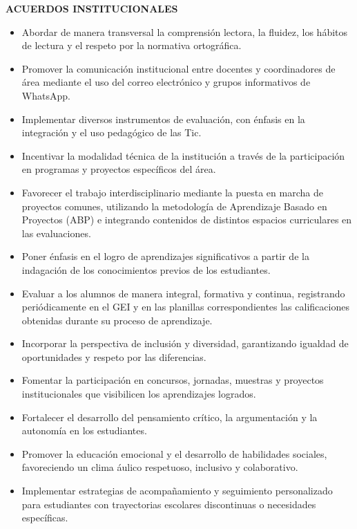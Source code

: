 \documentclass[a4paper,12pt]{article}
\begin{document}
\begin{center}
  \fontsize{12pt}{14pt}\selectfont \textbf{\uppercase{ACUERDOS INSTITUCIONALES}}
\end{center}
\begin{itemize}[leftmargin=*, itemsep=0pt, parsep=0pt]
  \item Abordar de manera transversal la comprensión lectora, la
    fluidez, los hábitos de lectura y el respeto por la normativa ortográfica.
  \item Promover la comunicación institucional entre docentes y
    coordinadores de área mediante el uso del correo electrónico y
    grupos informativos de WhatsApp.
  \item Implementar diversos instrumentos de evaluación, con énfasis
    en la integración y el uso pedagógico de las Tic.
  \item Incentivar la modalidad técnica de la institución a través de
    la participación en programas y proyectos específicos del área.
  \item Favorecer el trabajo interdisciplinario mediante la puesta en
    marcha de proyectos comunes, utilizando la metodología de
    Aprendizaje Basado en Proyectos (ABP) e integrando contenidos de
    distintos espacios curriculares en las evaluaciones.
  \item Poner énfasis en el logro de aprendizajes significativos a
    partir de la indagación de los conocimientos previos de los estudiantes.
  \item Evaluar a los alumnos de manera integral, formativa y
    continua, registrando periódicamente en el GEI y en las planillas
    correspondientes las calificaciones obtenidas durante su proceso
    de aprendizaje.
  \item Incorporar la perspectiva de inclusión y diversidad,
    garantizando igualdad de oportunidades y respeto por las diferencias.
  \item Fomentar la participación en concursos, jornadas, muestras y
    proyectos institucionales que visibilicen los aprendizajes logrados.
  \item Fortalecer el desarrollo del pensamiento crítico, la
    argumentación y la autonomía en los estudiantes.
  \item Promover la educación emocional y el desarrollo de
    habilidades sociales, favoreciendo un clima áulico respetuoso,
    inclusivo y colaborativo.
  \item Implementar estrategias de acompañamiento y seguimiento
    personalizado para estudiantes con trayectorias escolares
    discontinuas o necesidades específicas.
\end{itemize}
\end{document}
